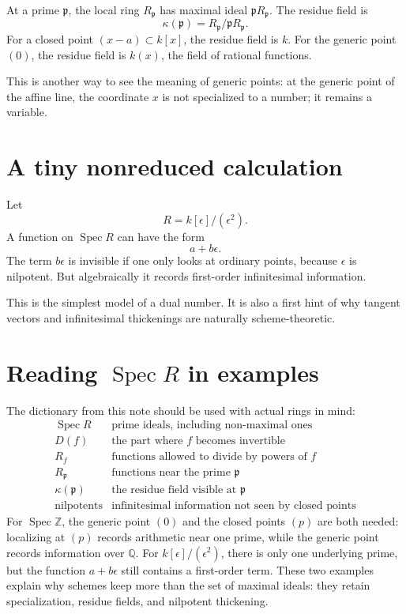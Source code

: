 At a prime \(\mathfrak p\), the local ring \(R_{\mathfrak p}\) has maximal ideal \(\mathfrak pR_{\mathfrak p}\).  The residue field is
\[
  \kappa(\mathfrak p)=R_{\mathfrak p}/\mathfrak pR_{\mathfrak p}.
\]
For a closed point \((x-a)\subset k[x]\), the residue field is \(k\).  For the generic point \((0)\), the residue field is \(k(x)\), the field of rational functions.

This is another way to see the meaning of generic points: at the generic point of the affine line, the coordinate \(x\) is not specialized to a number; it remains a variable.

\section{A tiny nonreduced calculation}

Let
\[
  R=k[\epsilon]/(\epsilon^2).
\]
A function on \(\operatorname{Spec}R\) can have the form
\[
  a+b\epsilon.
\]
The term \(b\epsilon\) is invisible if one only looks at ordinary points, because \(\epsilon\) is nilpotent.  But algebraically it records first-order infinitesimal information.

This is the simplest model of a dual number.  It is also a first hint of why tangent vectors and infinitesimal thickenings are naturally scheme-theoretic.

\section{Reading \texorpdfstring{$\operatorname{Spec}R$}{Spec R} in examples}

The dictionary from this note should be used with actual rings in mind:
\[
\begin{array}{c|c}
\operatorname{Spec}R & \text{prime ideals, including non-maximal ones}\\
D(f) & \text{the part where }f\text{ becomes invertible}\\
R_f & \text{functions allowed to divide by powers of }f\\
R_{\mathfrak p} & \text{functions near the prime }\mathfrak p\\
\kappa(\mathfrak p) & \text{the residue field visible at }\mathfrak p\\
\text{nilpotents} & \text{infinitesimal information not seen by closed points}
\end{array}
\]
For \(\operatorname{Spec}\mathbb Z\), the generic point \((0)\) and the closed points \((p)\) are both needed: localizing at \((p)\) records arithmetic near one prime, while the generic point records information over \(\mathbb Q\).  For \(k[\epsilon]/(\epsilon^2)\), there is only one underlying prime, but the function \(a+b\epsilon\) still contains a first-order term.  These two examples explain why schemes keep more than the set of maximal ideals: they retain specialization, residue fields, and nilpotent thickening.
